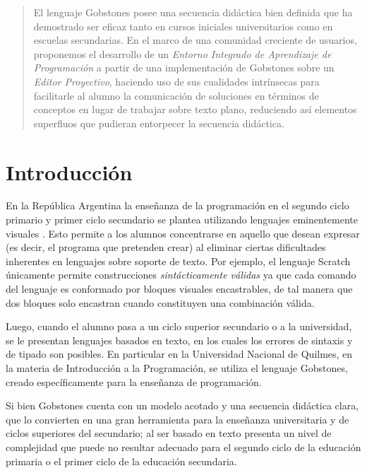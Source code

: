 \begin{abstract}
El lenguaje Gobstones posee una secuencia didáctica bien definida que ha demostrado ser eficaz tanto en cursos iniciales universitarios como en escuelas secundarias. En el marco de una comunidad creciente de usuarios, proponemos el desarrollo de un \textit{Entorno Integrado de Aprendizaje de Programación} a partir de una implementación de Gobstones sobre un \textit{Editor Proyectivo}, haciendo uso de sus cualidades intrínsecas para facilitarle al alumno la comunicación de soluciones en términos de conceptos en lugar de trabajar sobre texto plano, reduciendo así elementos superfluos que pudieran entorpecer la secuencia didáctica.
\end{abstract}



\section{Introducción}

En la República Argentina la enseñanza de la programación en el segundo ciclo primario y primer ciclo secundario se plantea utilizando lenguajes eminentemente visuales \cite{CuadernoDocenteProgramAR}. Esto permite a los alumnos concentrarse en aquello que desean expresar (es decir, el programa que pretenden crear) al eliminar ciertas dificultades inherentes en lenguajes sobre soporte de texto. Por ejemplo, el lenguaje Scratch\cite{scratch} únicamente permite construcciones \textit{sintácticamente válidas} ya que cada comando del lenguaje es conformado por bloques visuales encastrables, de tal manera que dos bloques solo encastran cuando constituyen una combinación válida.

Luego, cuando el alumno pasa a un ciclo superior secundario o a la universidad, se le presentan lenguajes basados en texto, en los cuales los errores de sintaxis y de tipado son posibles. En particular en la Universidad Nacional de Quilmes, en la materia de Introducción a la Programación, se utiliza el lenguaje Gobstones\cite{Gobstones}, creado específicamente para la enseñanza de programación.

Si bien Gobstones cuenta con un modelo acotado y una secuencia didáctica clara, que lo convierten en una gran herramienta para la enseñanza universitaria y de ciclos superiores del secundario; al ser basado en texto presenta un nivel de complejidad que puede no resultar adecuado para el segundo ciclo de la educación primaria o el primer ciclo de la educación secundaria.

